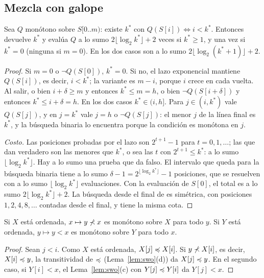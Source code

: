 

\subsection{Mezcla con galope}

\begin{lema}[Galope]\label{lem:galope}
Sea $Q$ monótono sobre $S[0..m)$: existe $k^*$ con $Q(S[i])\iff i<k^*$. Entonces
 devuelve $k^*$ y evalúa $Q$ a lo sumo $2\lfloor\log_2 k^*\rfloor+2$ veces
si $k^*\ge1$, y una vez si $k^*=0$ (ninguna si $m=0$). En los dos casos son a lo sumo
$2\lfloor\log_2(k^*{+}1)\rfloor+2$.
\end{lema}
\begin{proof}
Si $m=0$ o $\neg Q(S[0])$, $k^*=0$. Si no, el lazo exponencial mantiene $Q(S[i])$, es
decir, $i<k^*$; la variante es $m-i$, porque $i$ crece en cada vuelta. Al salir, o bien
$i+\delta\ge m$ y entonces $k^*\le m=h$, o bien $\neg Q(S[i+\delta])$ y entonces
$k^*\le i+\delta=h$. En los dos casos $k^*\in(i,h]$. Para $j\in(i,k^*)$ vale $Q(S[j])$, y
en $j=k^*$ vale $j=h$ o $\neg Q(S[j])$: el menor $j$ de la línea final es $k^*$, y la
búsqueda binaria lo encuentra porque la condición es monótona en $j$.

\emph{Costo.} Las posiciones probadas por el lazo son $2^{t+1}-1$ para $t=0,1,\dots$;
las que dan verdadero son las menores que $k^*$, o sea las $t$ con
$2^{t+1}\le k^*$: a lo sumo $\lfloor\log_2k^*\rfloor$. Hay a lo sumo una prueba que da
falso. El intervalo que queda para la búsqueda binaria tiene a lo sumo
$\delta-1=2^{\lfloor\log_2 k^*\rfloor}-1$ posiciones, que se resuelven con a lo sumo
$\lfloor\log_2k^*\rfloor$ evaluaciones. Con la evaluación de $S[0]$, el total es a lo
sumo $2\lfloor\log_2k^*\rfloor+2$. La búsqueda desde el final de \MDer es simétrica,
con posiciones $1, 2, 4, 8,\dots$ contadas desde el final, y tiene la misma cota.
\end{proof}

\begin{lema}[Monotonía]\label{lem:galmono}
Si $X$ está ordenada, $x\mapsto y\not\prec x$ es monótono sobre $X$ para todo $y$. Si $Y$
está ordenada, $y\mapsto y\lt x$ es monótono sobre $Y$ para todo $x$.
\end{lema}
\begin{proof}
Sean $j<i$. Como $X$ está ordenada, $X[j]\preccurlyeq X[i]$. Si $y\not\prec X[i]$, es decir,
$X[i]\preccurlyeq y$, la transitividad de $\preccurlyeq$ (Lema~\ref{lem:swo}(d)) da $X[j]\preccurlyeq y$. En
el segundo caso, si $Y[i]\lt x$, el Lema~\ref{lem:swo}(c) con $Y[j]\preccurlyeq Y[i]$ da
$Y[j]\lt x$.
\end{proof}

